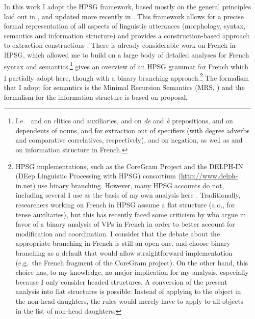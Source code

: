 In this work I adopt the HPSG framework, based mostly on the general principles laid out in \citet{Pollard.1994}, and updated more recently in \citet*{HPSG.2020}. This framework allows for a precise formal representation of all aspects of linguistic utterances (morphology, syntax, semantics and information structure) and provides a construction-based approach to extraction constructions \citep{Sag.1997,Sag.2010,Ginzburg.2000}. There is already considerable work on French in HPSG, which allowed me to build on a large body of detailed analyses for French syntax and semantics.\footnote{I.e.\ \citet{Miller.1997} and \citet{Abeille.2002} on clitics and auxiliaries, \citet{Abeille.2004} and \citet{Abeille.2006.AandDe} on \emph{de} and \emph{à} prepositions, \citet{Sag.1994.Godard} and \citet{Godard.1996} on dependents of nouns, \citet{Abeille.2003.Flexibility} and \citet{Abeille.2006.Correlatives} for extraction out of specifiers (with degree adverbs and comparative correlatives, respectively), \citet{Abeille.1997} and \citet{Kim.2002} on negation, as well as \citet{Abeille.2008.NP-preposing} and \citet{Marandin.2011} on information structure in French.} 
\citet{Abeille.2007.Grammaires} gives an overview of an HPSG grammar for French which I partially adopt here, though with a binary branching approach.\footnote{HPSG implementations, such as the CoreGram Project \citep{Mueller.S.2015} and the DELPH-IN (DEep Linguistic Processing with HPSG) consortium (\url{http://www.delph-in.net}) use binary branching. However, many HPSG accounts do not, including several I use as the basis of my own analysis here \citep[a.o.][]{Sag.1997,Ginzburg.2000}. 
Traditionally, researchers working on French in HPSG assume a flat structure (a.o., \citealt{Abeille.2002} for tense auxiliaries), but this has recently faced some criticism by \citet{Aguila-Multner.2020} who argue in favor of a binary analysis of VPs in French in order to better account for modification and coordination. I consider that the debate about the appropriate branching in French is still an open one, and choose binary branching as a default that would allow straightforward implementation (e.g.\ the French fragment of the CoreGram project). On the other hand, this choice has, to my knowledge, no major implication for my analysis, especially because I only consider headed structures. A conversion of the present analysis into flat structures is possible: Instead of applying to the object in the non-head daughters, the rules would merely have to apply to all objects in the list of non-head daughters.} The formalism that I adopt for semantics is the Minimal Recursion Semantics (MRS, \citealt{Copestake.2005}) and the formalism for the information structure is based on  proposal.

